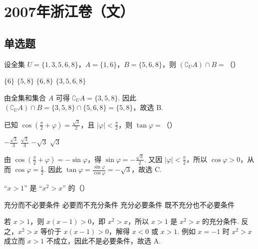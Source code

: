 \chapter{2007年浙江卷（文）}


\section{单选题}

\begin{problem}
设全集 \(U=\{1, 3, 5, 6, 8\}\)，\(A=\{1, 6\}\)，\(B=\{5, 6, 8\}\)，则 \(\left(\complement_U A\right)\cap B=\)（\quad）

\choices
    {\(\{6\}\)}
    {\(\{5, 8\}\)}
    {\(\{6, 8\}\)}
    {\(\{3, 5, 6, 8\}\)}
\end{problem}

\begin{solution}
由全集和集合 \(A\) 可得 \(\complement_U A=\{3,5,8\}\). 因此 \(\left(\complement_U A\right)\cap B=\{3,5,8\}\cap\{5,6,8\}=\{5,8\}\)，故选 B.
\end{solution}

\begin{problem}
已知 \(\cos\left(\frac{\pi}{2}+\varphi\right)=\frac{\sqrt{3}}{2}\)，且 \(\left|\varphi\right|<\frac{\pi}{2}\)，则 \(\tan\varphi=\)（\quad）

\choices
    {\(-\frac{\sqrt{3}}{3}\)}
    {\(\frac{\sqrt{3}}{3}\)}
    {\(-\sqrt{3}\)}
    {\(\sqrt{3}\)}
\end{problem}

\begin{solution}
由 \(\cos\left(\frac{\pi}{2}+\varphi\right)=-\sin\varphi\)，得 \(\sin\varphi=-\frac{\sqrt{3}}{2}\). 又因 \(\left|\varphi\right|<\frac{\pi}{2}\)，所以 \(\cos\varphi>0\)，从而 \(\cos\varphi=\frac{1}{2}\). 因此 \(\tan\varphi=\frac{\sin\varphi}{\cos\varphi}=-\sqrt{3}\)，故选 C.
\end{solution}

\begin{problem}
“\(x>1\)” 是 “\(x^2>x\)” 的（\quad）

\choices
    {充分而不必要条件}
    {必要而不充分条件}
    {充分必要条件}
    {既不充分也不必要条件}
\end{problem}

\begin{solution}
若 \(x>1\)，则 \(x(x-1)>0\)，即 \(x^2>x\)，所以 \(x>1\) 是 \(x^2>x\) 的充分条件. 反之，\(x^2>x\) 等价于 \(x(x-1)>0\)，解得 \(x<0\) 或 \(x>1\). 例如 \(x=-1\) 时 \(x^2>x\) 成立而 \(x>1\) 不成立，因此不是必要条件，故选 A.
\end{solution}

